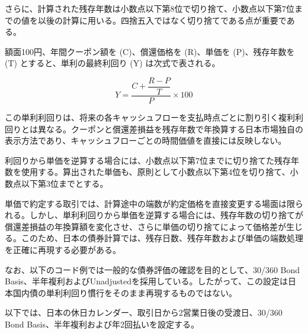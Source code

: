 \documentclass[
  letterpaper,
  DIV=11,
  numbers=noendperiod]{scrreprt}
\begin{document}
さらに、計算された残存年数は小数点以下第8位で切り捨て、小数点以下第7位までの値を以後の計算に用いる。四捨五入ではなく切り捨てである点が重要である。

額面100円、年間クーポン額を (C)、償還価格を (R)、単価を (P)、残存年数を
(T) とすると、単利の最終利回り (Y) は次式で表される。

\[
Y=
\frac{
C+\dfrac{R-P}{T}
}{
P
}
\times 100
\]

この単利利回りは、将来の各キャッシュフローを支払時点ごとに割り引く複利利回りとは異なる。クーポンと償還差損益を残存年数で年換算する日本市場独自の表示方法であり、キャッシュフローごとの時間価値を直接には反映しない。

利回りから単価を逆算する場合には、小数点以下第7位までに切り捨てた残存年数を使用する。算出された単価も、原則として小数点以下第4位を切り捨て、小数点以下第3位までとする。

単価で約定する取引では、計算途中の端数が約定価格を直接変更する場面は限られる。しかし、単利利回りから単価を逆算する場合には、残存年数の切り捨てが償還差損益の年換算額を変化させ、さらに単価の切り捨てによって価格差が生じる。このため、日本の債券計算では、残存日数、残存年数および単価の端数処理を正確に再現する必要がある。

なお、以下のコード例では一般的な債券評価の確認を目的として、30/360 Bond
Basis、半年複利およびUnadjustedを採用している。したがって、この設定は日本国内債の単利利回り慣行をそのまま再現するものではない。

以下では、日本の休日カレンダー、取引日から2営業日後の受渡日、30/360 Bond
Basis、半年複利および年2回払いを設定する。
\end{document}
